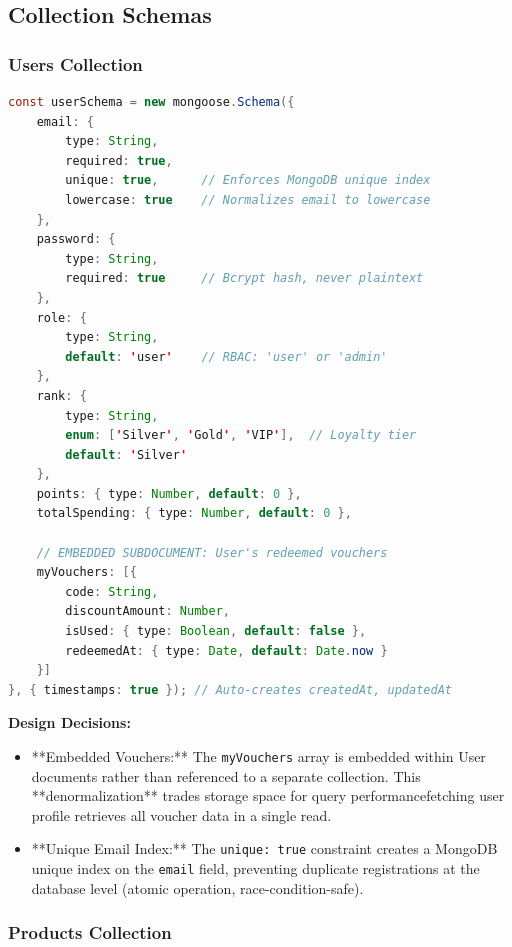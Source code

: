 \documentclass[12pt, a4paper]{report}
\begin{document}
\subsection{Collection Schemas}

\subsubsection{Users Collection}

\begin{lstlisting}[language=Java, caption=User Schema (server.js:91-101)]
const userSchema = new mongoose.Schema({
    email: { 
        type: String, 
        required: true, 
        unique: true,      // Enforces MongoDB unique index
        lowercase: true    // Normalizes email to lowercase
    },
    password: { 
        type: String, 
        required: true     // Bcrypt hash, never plaintext
    },
    role: { 
        type: String, 
        default: 'user'    // RBAC: 'user' or 'admin'
    },
    rank: { 
        type: String, 
        enum: ['Silver', 'Gold', 'VIP'],  // Loyalty tier
        default: 'Silver' 
    },
    points: { type: Number, default: 0 },
    totalSpending: { type: Number, default: 0 },
    
    // EMBEDDED SUBDOCUMENT: User's redeemed vouchers
    myVouchers: [{
        code: String,
        discountAmount: Number,
        isUsed: { type: Boolean, default: false },
        redeemedAt: { type: Date, default: Date.now }
    }]
}, { timestamps: true }); // Auto-creates createdAt, updatedAt
\end{lstlisting}

\textbf{Design Decisions:}
\begin{itemize}
    \item **Embedded Vouchers:** The \texttt{myVouchers} array is embedded within User documents rather than referenced to a separate collection. This **denormalization** trades storage space for query performancefetching user profile retrieves all voucher data in a single read.
    \item **Unique Email Index:** The \texttt{unique: true} constraint creates a MongoDB unique index on the \texttt{email} field, preventing duplicate registrations at the database level (atomic operation, race-condition-safe).
\end{itemize}

\subsubsection{Products Collection}
\end{document}
